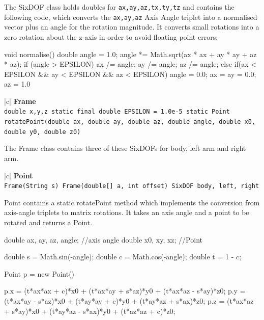 \documentclass[12pt,a4,notitlepage]{report}
\renewcommand{\_}{\texttt{\symbol{95}}}
\newcommand{\<}{\texttt{\symbol{60}}}
\renewcommand{\>}{\texttt{\symbol{62}}}
\newcommand{\class}[1]{\textbf{#1}}
\newcommand{\variable}[1]{\texttt{#1}}
\begin{document}
The SixDOF class holds doubles for \variable{ax,ay,az,tx,ty,tz} and contains the following code, which converts the \variable{ax,ay,az} Axis Angle triplet into a normalised vector plus an angle for the rotation magnitude. It converts small rotations into a zero rotation about the z-axis in order to avoid floating point errors:
\begin{code}
void normalise()
{
    double angle = 1.0;
    angle *= Math.sqrt(ax * ax + ay * ay + az * az);
    if (angle > EPSILON)
    {
        ax /= angle;
        ay /= angle;
        az /= angle;
    }
    else if(ax < EPSILON && ay < EPSILON && az < EPSILON)
    {
        angle = 0.0;
        ax = ay = 0.0;
        az = 1.0
    }
}
\end{code}
\begin{tabular}{|c|} \hline 
\class{Frame} \\ \hline
{}
{\variable{double x,y,z \newline
  static final double EPSILON = 1.0e-5 \newline
  static Point rotatePoint(double ax, double ay, double az, double angle, double x0, double y0, double z0)
} } \\ \hline
\end{tabular}

The Frame class contains three of these SixDOFs for body, left arm and right arm.

\begin{tabular}{|c|} \hline 
\class{Point} \\ \hline
{}
{\variable{Frame(String s) \newline
  Frame(double[] a, int offset)\newline
  SixDOF body, left, right 
} } \\ \hline
\end{tabular}

Point contains a static rotatePoint method which implements the conversion from axis-angle triplets to matrix rotations. It takes an axis angle and a point to be rotated and returns a Point.

\begin{code}
double ax, ay, az, angle; //axis angle
double x0, xy, xz; //Point

double s = Math.sin(-angle);
double c = Math.cos(-angle);
double t = 1 - c;

Point p = new Point()

p.x = (t*ax*ax + c)*x0 + (t*ax*ay + s*az)*y0 + (t*ax*az - s*ay)*z0;
p.y = (t*ax*ay - s*az)*x0 + (t*ay*ay + c)*y0 + (t*ay*az + s*ax)*z0;
p.z = (t*ax*az + s*ay)*x0 + (t*ay*az - s*ax)*y0 + (t*az*az + c)*z0;
\end{code}
\end{document}
